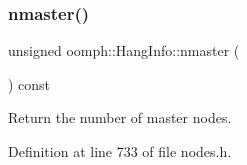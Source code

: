 \mbox{\label{classoomph_1_1HangInfo_aa9c1130b58db2ff6d5eee4f923ba365c}} 
\subsubsection{\texorpdfstring{nmaster()}{nmaster()}}
{\footnotesize\ttfamily unsigned oomph\+::\+Hang\+Info\+::nmaster (\begin{DoxyParamCaption}{ }\end{DoxyParamCaption}) const\hspace{0.3cm}{\ttfamily [inline]}}



Return the number of master nodes. 



Definition at line 733 of file nodes.\+h.



